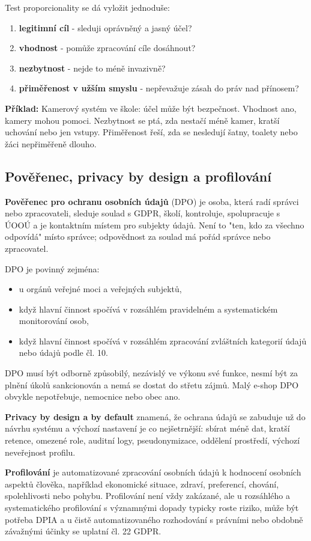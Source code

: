 \documentclass[11pt,a4paper]{article}
\newcommand{\priklad}[1]{\begin{tcolorbox}[breakable,enhanced,colback=green!7,colframe=green!30!black,boxrule=0pt,arc=1mm,left=5pt,right=5pt,top=5pt,bottom=5pt,before skip=6pt,after skip=6pt]\textbf{Příklad:} #1\end{tcolorbox}}
\begin{document}
Test proporcionality se dá vyložit jednoduše:
\begin{enumerate}
  \item \textbf{legitimní cíl} - sleduji oprávněný a jasný účel?
  \item \textbf{vhodnost} - pomůže zpracování cíle dosáhnout?
  \item \textbf{nezbytnost} - nejde to méně invazivně?
  \item \textbf{přiměřenost v užším smyslu} - nepřevažuje zásah do práv nad přínosem?
\end{enumerate}

\priklad{Kamerový systém ve škole: účel může být bezpečnost. Vhodnost ano, kamery mohou pomoci. Nezbytnost se ptá, zda nestačí méně kamer, kratší uchování nebo jen vstupy. Přiměřenost řeší, zda se nesledují šatny, toalety nebo žáci nepřiměřeně dlouho.}

\subsection*{Pověřenec, privacy by design a profilování}
\textbf{Pověřenec pro ochranu osobních údajů} (DPO) je osoba, která radí správci nebo zpracovateli, sleduje soulad s GDPR, školí, kontroluje, spolupracuje s ÚOOÚ a je kontaktním místem pro subjekty údajů. Není to "ten, kdo za všechno odpovídá" místo správce; odpovědnost za soulad má pořád správce nebo zpracovatel.

DPO je povinný zejména:
\begin{itemize}
  \item u orgánů veřejné moci a veřejných subjektů,
  \item když hlavní činnost spočívá v rozsáhlém pravidelném a systematickém monitorování osob,
  \item když hlavní činnost spočívá v rozsáhlém zpracování zvláštních kategorií údajů nebo údajů podle čl. 10.
\end{itemize}
DPO musí být odborně způsobilý, nezávislý ve výkonu své funkce, nesmí být za plnění úkolů sankcionován a nemá se dostat do střetu zájmů. Malý e-shop DPO obvykle nepotřebuje, nemocnice nebo obec ano.

\textbf{Privacy by design a by default} znamená, že ochrana údajů se zabuduje už do návrhu systému a výchozí nastavení je co nejšetrnější: sbírat méně dat, kratší retence, omezené role, auditní logy, pseudonymizace, oddělení prostředí, výchozí neveřejnost profilu.

\textbf{Profilování} je automatizované zpracování osobních údajů k hodnocení osobních aspektů člověka, například ekonomické situace, zdraví, preferencí, chování, spolehlivosti nebo pohybu. Profilování není vždy zakázané, ale u rozsáhlého a systematického profilování s významnými dopady typicky roste riziko, může být potřeba DPIA a u čistě automatizovaného rozhodování s právními nebo obdobně závažnými účinky se uplatní čl. 22 GDPR.
\end{document}
